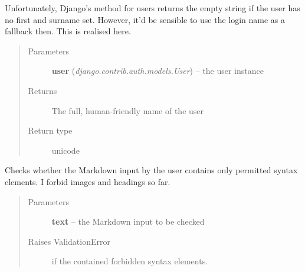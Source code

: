 \documentclass[a4paper,11pt,english]{sphinxmanual}
\begin{document}
\begin{fulllineitems}
\label{programming/utilities:jb_common.utils.base.get_really_full_name}
Unfortunately, Django's  method for users returns the
empty string if the user has no first and surname set.  However, it'd be
sensible to use the login name as a fallback then.  This is realised here.
\begin{quote}\begin{description}
\item[{Parameters}] \leavevmode
\textbf{user} (\emph{django.contrib.auth.models.User}) -- the user instance

\item[{Returns}] \leavevmode
The full, human-friendly name of the user

\item[{Return type}] \leavevmode
unicode

\end{description}\end{quote}

\end{fulllineitems}


\begin{fulllineitems}
\label{programming/utilities:jb_common.utils.base.check_markdown}
Checks whether the Markdown input by the user contains only permitted
syntax elements.  I forbid images and headings so far.
\begin{quote}\begin{description}
\item[{Parameters}] \leavevmode
\textbf{text} -- the Markdown input to be checked

\item[{Raises ValidationError}] \leavevmode
if the  contained forbidden syntax
elements.

\end{description}\end{quote}

\end{fulllineitems}

\end{document}
